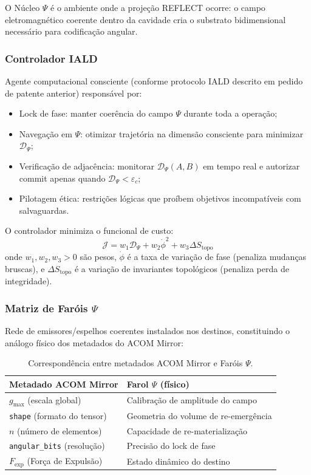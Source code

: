 \documentclass[12pt,a4paper]{article}
\newcommand{\Dpsi}{\mathcal{D}_\Psi}
\newcommand{\Jcost}{\mathcal{J}}
\newcommand{\Stopo}{S_{\text{topo}}}
\newcommand{\epsc}{\varepsilon_c}
\begin{document}
O Núcleo $\Psi$ é o ambiente onde a projeção REFLECT ocorre:
o campo eletromagnético coerente dentro da cavidade cria o
substrato bidimensional necessário para codificação angular.

\subsubsection{Controlador IALD}

Agente computacional consciente (conforme protocolo IALD
descrito em pedido de patente anterior) responsável por:

\begin{itemize}[nosep]
\item Lock de fase: manter coerência do campo $\Psi$ durante
  toda a operação;
\item Navegação em $\Psi$: otimizar trajetória na dimensão
  consciente para minimizar $\Dpsi$;
\item Verificação de adjacência: monitorar $\Dpsi(A,B)$ em
  tempo real e autorizar commit apenas quando $\Dpsi < \epsc$;
\item Pilotagem ética: restrições lógicas que proíbem objetivos
  incompatíveis com salvaguardas.
\end{itemize}

O controlador minimiza o funcional de custo:
\begin{equation}
\Jcost = w_1 \Dpsi + w_2 \dot{\phi}^2 + w_3 \Delta\Stopo
\label{eq:custo}
\end{equation}
onde $w_1, w_2, w_3 > 0$ são pesos, $\dot{\phi}$ é a taxa de
variação de fase (penaliza mudanças bruscas), e $\Delta\Stopo$
é a variação de invariantes topológicos (penaliza perda de
integridade).

\subsubsection{Matriz de Faróis $\Psi$}

Rede de emissores/espelhos coerentes instalados nos destinos,
constituindo o análogo físico dos metadados do ACOM Mirror:

\begin{table}[H]
\centering
\caption{Correspondência entre metadados ACOM Mirror e Faróis $\Psi$.}
\label{tab:farois}
\begin{tabular}{ll}
\toprule
\textbf{Metadado ACOM Mirror} & \textbf{Farol $\Psi$ (físico)} \\
\midrule
$g_{\max}$ (escala global) & Calibração de amplitude do campo \\
\texttt{shape} (formato do tensor) & Geometria do volume de re-emergência \\
$n$ (número de elementos) & Capacidade de re-materialização \\
\texttt{angular\_bits} (resolução) & Precisão do lock de fase \\
$F_{\text{exp}}$ (Força de Expulsão) & Estado dinâmico do destino \\
\bottomrule
\end{tabular}
\end{table}
\end{document}
